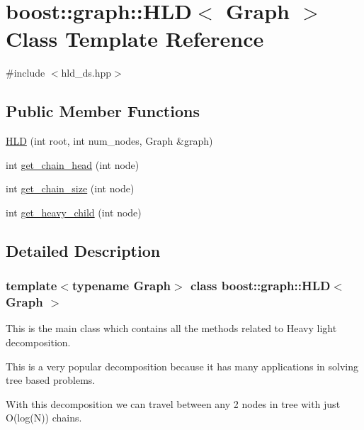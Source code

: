\hypertarget{classboost_1_1graph_1_1HLD}{}\section{boost\+:\+:graph\+:\+:H\+LD$<$ Graph $>$ Class Template Reference}
\label{classboost_1_1graph_1_1HLD}


{\ttfamily \#include $<$hld\+\_\+ds.\+hpp$>$}

\subsection*{Public Member Functions}
\begin{DoxyCompactItemize}
\item 
\hyperlink{classboost_1_1graph_1_1HLD_a47799bbf4db550158ccbf8ac9a0c5582}{H\+LD} (int root, int num\+\_\+nodes, Graph \&graph)
\item 
int \hyperlink{classboost_1_1graph_1_1HLD_af48f33013a216a9f5fc2d2f7008d17b6}{get\+\_\+chain\+\_\+head} (int node)
\item 
int \hyperlink{classboost_1_1graph_1_1HLD_a3074f4291c264d79247f9d65f03923b1}{get\+\_\+chain\+\_\+size} (int node)
\item 
int \hyperlink{classboost_1_1graph_1_1HLD_a174ef9cc45868ae35ed21e83795b3001}{get\+\_\+heavy\+\_\+child} (int node)
\end{DoxyCompactItemize}


\subsection{Detailed Description}
\subsubsection*{template$<$typename Graph$>$\newline
class boost\+::graph\+::\+H\+L\+D$<$ Graph $>$}


\begin{DoxyItemize}
\item This is the main class which contains all the methods related to Heavy light decomposition. 
\item This is a very popular decomposition because it has many applications in solving tree based problems. 
\item With this decomposition we can travel between any 2 nodes in tree with just O(log(\+N)) chains. 
\end{DoxyItemize}

